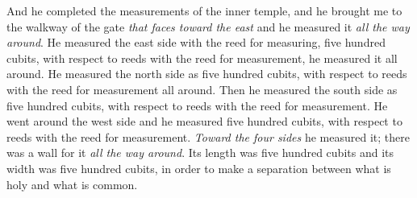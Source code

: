 \begin{biblechapter}
\verse And he completed the measurements of the inner temple, and he brought me to the walkway of the gate \textit{that faces toward the east} and he measured it \textit{all the way around}.
\verse He measured the east side with the reed for measuring, five hundred cubits, with respect to reeds with the reed for measurement, he measured it all around.
\verse He measured the north side as five hundred cubits, with respect to reeds with the reed for measurement all around.
\verse Then he measured the south side as five hundred cubits, with respect to reeds with the reed for measurement.
\verse He went around the west side and he measured five hundred cubits, with respect to reeds with the reed for measurement.
\verse \textit{Toward the four sides} he measured it; there was a wall for it \textit{all the way around}. Its length was five hundred cubits and its width was five hundred cubits, in order to make a separation between what is holy and what is common.
\end{biblechapter}

